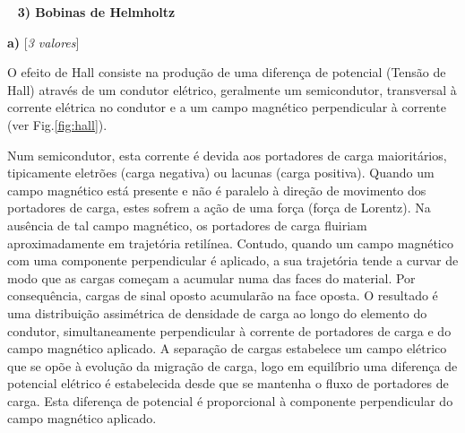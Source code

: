 \documentclass[11pt,a4paper,final]{article}
\begin{document}
~\linebreak
\noindent\textbf{3) Bobinas de Helmholtz} %

\textbf{a)} \hfill [\textit{3 valores}]

O efeito de Hall consiste na produ\c{c}\~{a}o de uma diferen\c{c}a de potencial (Tens\~{a}o de Hall) atrav\'{e}s de um condutor el\'{e}trico, geralmente um semicondutor, transversal \`{a} corrente el\'{e}trica no condutor e a um campo magn\'{e}tico perpendicular \`{a} corrente (ver Fig.\ref{fig:hall}).

Num semicondutor, esta corrente \'{e} devida aos portadores de carga maiorit\'{a}rios, tipicamente eletr\~{o}es (carga negativa) ou lacunas (carga positiva). Quando um campo magn\'{e}tico est\'{a} presente e n\~{a}o \' {e} paralelo \`{a} dire\c{c}\~{a}o de movimento dos portadores de carga, estes sofrem a a\c{c}\~{a}o de uma for\c{c}a (for\c{c}a de Lorentz). Na aus\^{e}ncia de tal campo magn\'{e}tico, os portadores de carga fluiriam aproximadamente em trajet\'{o}ria retil\'{i}nea. Contudo, quando um campo magn\'{e}tico com uma componente perpendicular \'{e} aplicado, a sua trajet\'{o}ria tende a curvar de modo que as cargas come\c{c}am a acumular numa das faces do material. Por consequ\^{e}ncia, cargas de sinal oposto acumular\~{a}o na face oposta. O resultado \'{e} uma distribui\c{c}\~{a}o assim\'{e}trica de densidade de carga ao longo do elemento do condutor, simultaneamente perpendicular \`{a} corrente de portadores de carga e do campo magn\'{e}tico aplicado. A separa\c{c}\~{a}o de cargas estabelece um campo el\'{e}trico que se op\~{o}e \`{a} evolu\c{c}\~{a}o da migra\c{c}\~{a}o de carga, logo em equil\'{i}brio uma diferen\c{c}a de potencial el\'{e}trico \'{e} estabelecida desde que se mantenha o fluxo de portadores de carga. Esta diferen\c{c}a de potencial \'{e} proporcional \`{a} componente perpendicular do campo magn\'{e}tico aplicado.
\end{document}
